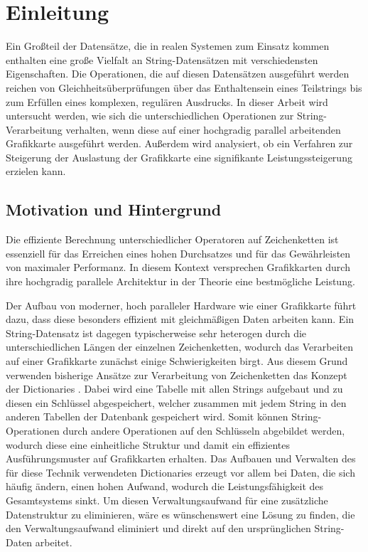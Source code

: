 \chapter{Einleitung}

Ein Großteil der Datensätze, die in realen Systemen zum Einsatz kommen enthalten eine große Vielfalt an String-Datensätzen mit verschiedensten Eigenschaften.
Die Operationen, die auf diesen Datensätzen ausgeführt werden reichen von Gleichheitsüberprüfungen über das Enthaltensein eines Teilstrings bis zum Erfüllen eines komplexen, regulären Ausdrucks.
In dieser Arbeit wird untersucht werden, wie sich die unterschiedlichen Operationen zur String-Verarbeitung verhalten, wenn diese auf einer hochgradig parallel arbeitenden Grafikkarte ausgeführt werden.
Außerdem wird analysiert, ob ein Verfahren zur Steigerung der Auslastung der Grafikkarte eine signifikante Leistungssteigerung erzielen kann.

\section{Motivation und Hintergrund}

Die effiziente Berechnung unterschiedlicher Operatoren auf Zeichenketten ist essenziell für das Erreichen eines hohen Durchsatzes und für das Gewährleisten von maximaler Performanz.
In diesem Kontext versprechen Grafikkarten durch ihre hochgradig parallele Architektur in der Theorie eine bestmögliche Leistung.

Der Aufbau von moderner, hoch paralleler Hardware wie einer Grafikkarte führt dazu, dass diese besonders effizient mit gleichmäßigen Daten arbeiten kann.
Ein String-Datensatz ist dagegen typischerweise sehr heterogen durch die unterschiedlichen Längen der einzelnen Zeichenketten, wodurch das Verarbeiten auf einer Grafikkarte zunächst einige Schwierigkeiten birgt.
Aus diesem Grund verwenden bisherige Ansätze zur Verarbeitung von Zeichenketten das Konzept der Dictionaries \cite{Mueller2014}.
Dabei wird eine Tabelle mit allen Strings aufgebaut und zu diesen ein Schlüssel abgespeichert, welcher zusammen mit jedem String in den anderen Tabellen der Datenbank gespeichert wird.
Somit können String-Operationen durch andere Operationen auf den Schlüsseln abgebildet werden, wodurch diese eine einheitliche Struktur und damit ein effizientes Ausführungsmuster auf Grafikkarten erhalten.
Das Aufbauen und Verwalten des für diese Technik verwendeten Dictionaries erzeugt vor allem bei Daten, die sich häufig ändern, einen hohen Aufwand, wodurch die Leistungsfähigkeit des Gesamtsystems sinkt.
Um diesen Verwaltungsaufwand für eine zusätzliche Datenstruktur zu eliminieren, wäre es wünschenswert eine Lösung zu finden, die den Verwaltungsaufwand eliminiert und direkt auf den ursprünglichen String-Daten arbeitet.

